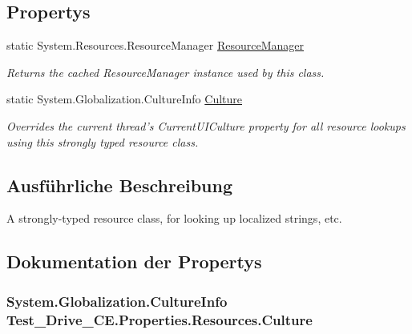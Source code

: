\subsection*{Propertys}
\begin{DoxyCompactItemize}
\item 
static System.Resources.ResourceManager \hyperlink{class_test___drive___c_e_1_1_properties_1_1_resources_a97da4c165bc96ab20ba9775fd55be717}{ResourceManager}
\begin{DoxyCompactList}\small\item\em Returns the cached ResourceManager instance used by this class. \item\end{DoxyCompactList}\item 
static System.Globalization.CultureInfo \hyperlink{class_test___drive___c_e_1_1_properties_1_1_resources_ad2ae1b65b5936fb3c18c099fdfc58380}{Culture}
\begin{DoxyCompactList}\small\item\em Overrides the current thread's CurrentUICulture property for all resource lookups using this strongly typed resource class. \item\end{DoxyCompactList}\end{DoxyCompactItemize}


\subsection{Ausführliche Beschreibung}
A strongly-\/typed resource class, for looking up localized strings, etc. 

\subsection{Dokumentation der Propertys}
\hypertarget{class_test___drive___c_e_1_1_properties_1_1_resources_ad2ae1b65b5936fb3c18c099fdfc58380}{
\subsubsection[{Culture}]{\setlength{\rightskip}{0pt plus 5cm}System.Globalization.CultureInfo Test\_\-Drive\_\-CE.Properties.Resources.Culture}}
\label{class_test___drive___c_e_1_1_properties_1_1_resources_ad2ae1b65b5936fb3c18c099fdfc58380}



